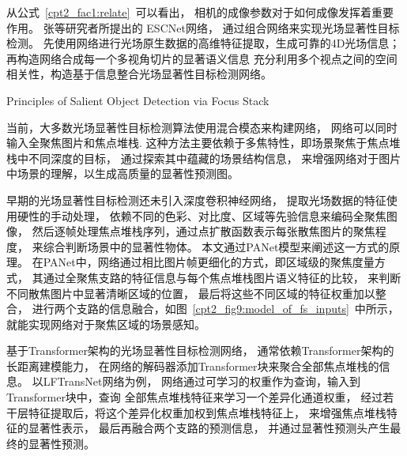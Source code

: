 从公式~\ref{cpt2_fac1:relate}~可以看出，
相机的成像参数对于如何成像发挥着重要作用。
张等研究者所提出的 ESCNet网络，
通过组合网络来实现光场显著性目标检测。
先使用网络进行光场原生数据的高维特征提取，生成可靠的4D光场信息；
再构造网络合成每一个多视角切片的显著语义信息
充分利用多个视点之间的空间相关性，构造基于信息整合光场显著性目标检测网络。









{Principles of Salient Object Detection via Focus Stack}

  
当前，大多数光场显著性目标检测算法使用混合模态来构建网络，
网络可以同时输入全聚焦图片和焦点堆栈.
这种方法主要依赖于多焦特性，即场景聚焦于焦点堆栈中不同深度的目标，
通过探索其中蕴藏的场景结构信息，
来增强网络对于图片中场景的理解，以生成高质量的显著性预测图。





早期的光场显著性目标检测还未引入深度卷积神经网络，
提取光场数据的特征使用硬性的手动处理，
依赖不同的色彩、对比度、区域等先验信息来编码全聚焦图像，
然后逐帧处理焦点堆栈序列，通过点扩散函数表示每张散焦图片的聚焦程度，
来综合判断场景中的显著性物体。
本文通过PANet模型来阐述这一方式的原理。
在PANet中，网络通过相比图片帧更细化的方式，即区域级的聚焦度量方式，
其通过全聚焦支路的特征信息与每个焦点堆栈图片语义特征的比较，
来判断不同散焦图片中显著清晰区域的位置，
最后将这些不同区域的特征权重加以整合，
进行两个支路的信息融合，如图~\ref{cpt2_fig9:model_of_fs_inputs}~中所示，
就能实现网络对于聚焦区域的场景感知。






基于Transformer架构的光场显著性目标检测网络，
通常依赖Transformer架构的长距离建模能力，
在网络的解码器添加Transformer块来聚合全部焦点堆栈的信息。
以LFTransNet网络\cite{liu2023lftransnet}为例，
网络通过可学习的权重作为查询，输入到Transformer块中，查询
全部焦点堆栈特征来学习一个差异化通道权重，
经过若干层特征提取后，将这个差异化权重加权到焦点堆栈特征上，
来增强焦点堆栈特征的显著性表示，
最后再融合两个支路的预测信息，
并通过显著性预测头产生最终的显著性预测。



